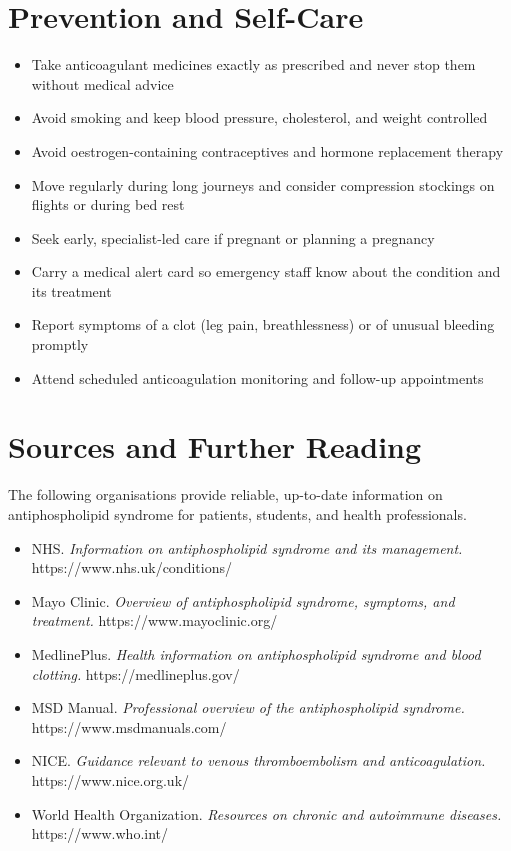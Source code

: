 \section*{Prevention and Self-Care}
\begin{itemize}
    \item Take anticoagulant medicines exactly as prescribed and never stop them without medical advice
    \item Avoid smoking and keep blood pressure, cholesterol, and weight controlled
    \item Avoid oestrogen-containing contraceptives and hormone replacement therapy
    \item Move regularly during long journeys and consider compression stockings on flights or during bed rest
    \item Seek early, specialist-led care if pregnant or planning a pregnancy
    \item Carry a medical alert card so emergency staff know about the condition and its treatment
    \item Report symptoms of a clot (leg pain, breathlessness) or of unusual bleeding promptly
    \item Attend scheduled anticoagulation monitoring and follow-up appointments
\end{itemize}

\section*{Sources and Further Reading}
The following organisations provide reliable, up-to-date information on antiphospholipid syndrome for patients, students, and health professionals.

\begin{itemize}
    \item NHS. \textit{Information on antiphospholipid syndrome and its management.} https://www.nhs.uk/conditions/
    \item Mayo Clinic. \textit{Overview of antiphospholipid syndrome, symptoms, and treatment.} https://www.mayoclinic.org/
    \item MedlinePlus. \textit{Health information on antiphospholipid syndrome and blood clotting.} https://medlineplus.gov/
    \item MSD Manual. \textit{Professional overview of the antiphospholipid syndrome.} https://www.msdmanuals.com/
    \item NICE. \textit{Guidance relevant to venous thromboembolism and anticoagulation.} https://www.nice.org.uk/
    \item World Health Organization. \textit{Resources on chronic and autoimmune diseases.} https://www.who.int/
\end{itemize}

